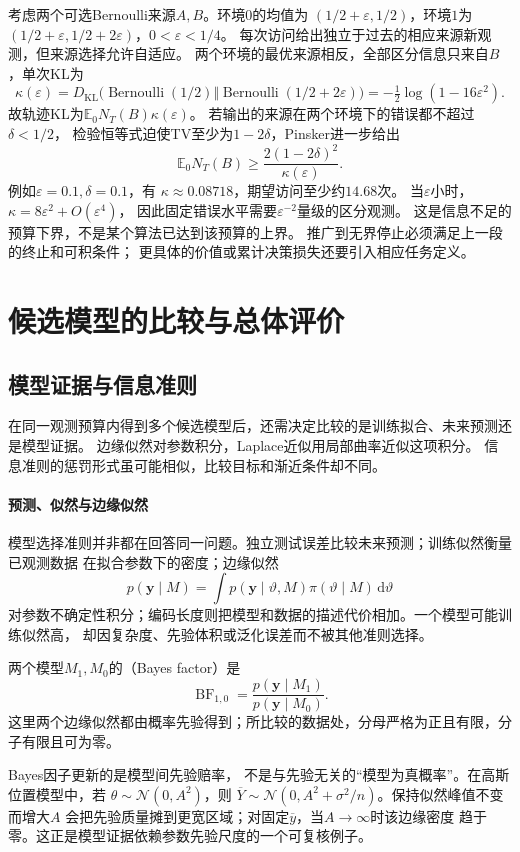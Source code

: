 考虑两个可选Bernoulli来源\(A,B\)。环境\(0\)的均值为
\((1/2+\varepsilon,1/2)\)，环境\(1\)为
\((1/2+\varepsilon,1/2+2\varepsilon)\)，\(0<\varepsilon<1/4\)。
每次访问给出独立于过去的相应来源新观测，但来源选择允许自适应。
两个环境的最优来源相反，全部区分信息只来自\(B\)，单次KL为
\[
  \kappa(\varepsilon)
  =D_{\mathrm{KL}}\bigl(\operatorname{Bernoulli}(1/2)
             \Vert\operatorname{Bernoulli}(1/2+2\varepsilon)\bigr)
  =-\tfrac12\log(1-16\varepsilon^2).
\]
故轨迹KL为\(\mathbb E_0N_T(B)\kappa(\varepsilon)\)。
若输出的来源在两个环境下的错误都不超过\(\delta<1/2\)，
检验恒等式迫使TV至少为\(1-2\delta\)，Pinsker进一步给出
\[
  \mathbb E_0N_T(B)\geq
  \frac{2(1-2\delta)^2}{\kappa(\varepsilon)}.
\]
例如\(\varepsilon=0.1,\delta=0.1\)，有
\(\kappa\approx0.08718\)，期望访问至少约\(14.68\)次。
当\(\varepsilon\)小时，\(\kappa=8\varepsilon^2+O(\varepsilon^4)\)，
因此固定错误水平需要\(\varepsilon^{-2}\)量级的区分观测。
这是信息不足的预算下界，不是某个算法已达到该预算的上界。
推广到无界停止必须满足上一段的终止和可积条件；
更具体的价值或累计决策损失还要引入相应任务定义。

\section{候选模型的比较与总体评价}
\label{sec:stats-model-comparison-data-acquisition}
\subsection{模型证据与信息准则}
\label{sec:statistics-model-evidence}
在同一观测预算内得到多个候选模型后，还需决定比较的是训练拟合、未来预测还是模型证据。
边缘似然对参数积分，Laplace近似用局部曲率近似这项积分。
信息准则的惩罚形式虽可能相似，比较目标和渐近条件却不同。

\paragraph{预测、似然与边缘似然}
模型选择准则并非都在回答同一问题。独立测试误差比较未来预测；训练似然衡量已观测数据
在拟合参数下的密度；边缘似然
\[
  p(\bm y\mid M)
  =\int p(\bm y\mid\vartheta,M)\pi(\vartheta\mid M)\,\mathrm d\vartheta
\]
对参数不确定性积分；编码长度则把模型和数据的描述代价相加。一个模型可能训练似然高，
却因复杂度、先验体积或泛化误差而不被其他准则选择。

\begin{definition}[Bayes因子]
  \label{def:statistics-bayes-factor}
两个模型\(M_1,M_0\)的（Bayes factor）是
\[
  \operatorname{BF}_{1,0}
  =\frac{p(\bm y\mid M_1)}{p(\bm y\mid M_0)}.
\]
这里两个边缘似然都由概率先验得到；所比较的数据处，分母严格为正且有限，分子有限且可为零。
\end{definition}
Bayes因子更新的是模型间先验赔率，
不是与先验无关的“模型为真概率”。在高斯位置模型中，若
\(\theta\sim\mathcal N(0,A^2)\)，则
\(\overline Y\sim\mathcal N(0,A^2+\sigma^2/n)\)。保持似然峰值不变而增大\(A\)
会把先验质量摊到更宽区域；对固定\(\overline y\)，当\(A\to\infty\)时该边缘密度
趋于零。这正是模型证据依赖参数先验尺度的一个可复核例子。

